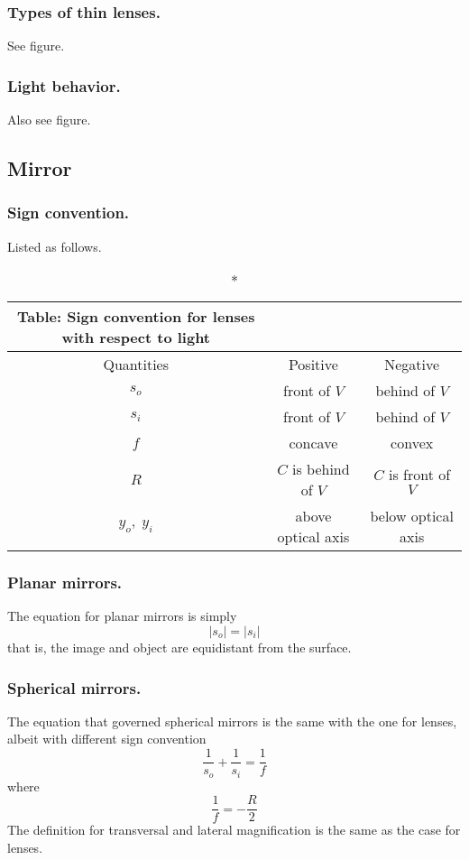 \documentclass[../../../main.tex]{subfiles}
\begin{document}
\subsubsection*{Types of thin lenses.} See figure.

\subsubsection*{Light behavior.} Also see figure.

\subsection*{Mirror}

\subsubsection*{Sign convention.} Listed as follows.
\begin{longtable}{c | c | c}
    \caption*{Table: Sign convention for lenses with respect to light}\\
    \hline
    Quantities & Positive & Negative\\ 
    \hline\hline
    $s_o$& front of $V $ & behind of $V $ \\ 
    $s_i$& front of $V $ & behind of $V $\\
    $f$& concave & convex \\
    $R$& $C$ is behind of $V $ & $C$ is front of $V $\\
    $y_o,\;y_i$& above optical axis &below optical axis\\
    \hline
\end{longtable}

\subsubsection*{Planar mirrors.} The equation for planar mirrors is simply
\begin{equation*}
    |s_o|=|s_i|
\end{equation*}
that is, the image and object  are equidistant from the surface.

\subsubsection*{Spherical mirrors.} The equation that governed spherical mirrors is the same with the one for lenses, albeit with different sign convention
 \begin{equation*}
    \frac{1}{s_o}+\frac{1}{s_i}=\frac{1}{f}
 \end{equation*}
 where
 \begin{equation*}
     \frac{1}{f}=-\frac{R}{2}
 \end{equation*}
The definition for transversal and lateral magnification is the same as the case for lenses. 
\end{document}
